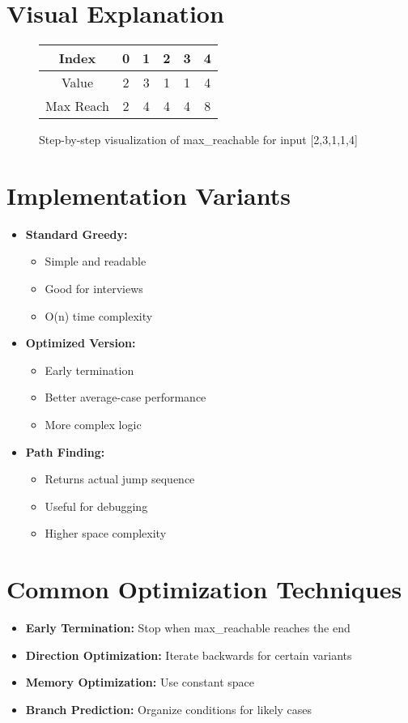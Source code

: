\section*{Visual Explanation}
\begin{figure}[h]
    \centering
    \begin{tabular}{|c|c|c|c|c|c|}
        \hline
        Index & 0 & 1 & 2 & 3 & 4 \\
        \hline
        Value & 2 & 3 & 1 & 1 & 4 \\
        \hline
        Max Reach & 2 & 4 & 4 & 4 & 8 \\
        \hline
    \end{tabular}
    \caption{Step-by-step visualization of max\_reachable for input [2,3,1,1,4]}
    \label{fig:jump_game_visualization}
\end{figure}

\section*{Implementation Variants}
\begin{itemize}
    \item \textbf{Standard Greedy:}
        \begin{itemize}
            \item Simple and readable
            \item Good for interviews
            \item O(n) time complexity
        \end{itemize}
    \item \textbf{Optimized Version:}
        \begin{itemize}
            \item Early termination
            \item Better average-case performance
            \item More complex logic
        \end{itemize}
    \item \textbf{Path Finding:}
        \begin{itemize}
            \item Returns actual jump sequence
            \item Useful for debugging
            \item Higher space complexity
        \end{itemize}
\end{itemize}

\section*{Common Optimization Techniques}
\begin{itemize}
    \item \textbf{Early Termination:} Stop when max\_reachable reaches the end
    \item \textbf{Direction Optimization:} Iterate backwards for certain variants
    \item \textbf{Memory Optimization:} Use constant space
    \item \textbf{Branch Prediction:} Organize conditions for likely cases
\end{itemize}

